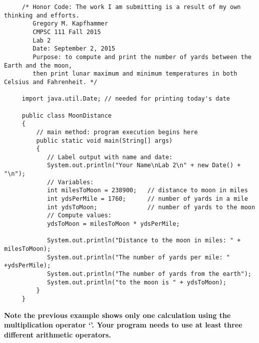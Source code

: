 \begin{verbatim}
     /* Honor Code: The work I am submitting is a result of my own thinking and efforts.
        Gregory M. Kapfhammer
        CMPSC 111 Fall 2015
        Lab 2
        Date: September 2, 2015
        Purpose: to compute and print the number of yards between the Earth and the moon,
        then print lunar maximum and minimum temperatures in both Celsius and Fahrenheit. */

     import java.util.Date; // needed for printing today's date

     public class MoonDistance
     {
         // main method: program execution begins here
         public static void main(String[] args)
         {
            // Label output with name and date:
            System.out.println("Your Name\nLab 2\n" + new Date() + "\n");
            // Variables:
            int milesToMoon = 238900;   // distance to moon in miles
            int ydsPerMile = 1760;      // number of yards in a mile
            int ydsToMoon;              // number of yards to the moon
            // Compute values:
            ydsToMoon = milesToMoon * ydsPerMile;

            System.out.println("Distance to the moon in miles: " + milesToMoon);
            System.out.println("The number of yards per mile: " +ydsPerMile);
            System.out.println("The number of yards from the earth");
            System.out.println("to the moon is " + ydsToMoon);
         }
     }
\end{verbatim}

\noindent \textbf{Note the previous example shows only one calculation using the multiplication operator `{\tt *}'. Your program
needs to use at least three different arithmetic operators. }

\vspace*{-.2in}
